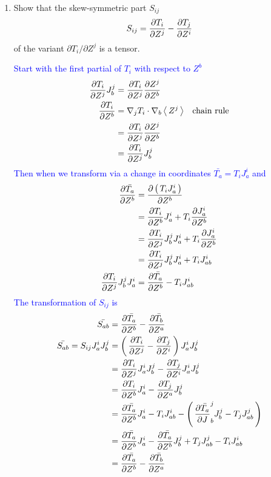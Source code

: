 \documentclass[12pt,a4paper]{report}
\newcommand{\RED}[1]{\textcolor{red}{#1}}
\newcommand{\BLUE}[1]{\textcolor{blue}{#1}}
\begin{document}
\begin{enumerate}[label=\textbf{\arabic*.}]
\BLUE{From 88 we have 
\begin{align*}
	\nabla' F &= \PART{F_i}{ Z^i} J^i_{i'}
\end{align*}differentiating this with respect to $Z^j$ gives us
\begin{align*}
	\PART{}{Z^j}\PAREN{\PART{F_i}{ Z^i} J^i_{i'}} &= \frac{\partial^2 F_i}{\partial Z^j\partial Z^i}J^i_{i'}+\PART{F_i}{ Z^i}\PAREN{\PART{}{Z^j} J^i_{i'} } \\
	&= \frac{\partial^2 F_i}{\partial Z^j\partial Z^i}J^i_{i'}+\PART{F_i}{ Z^i} J^i_{i'j}
\end{align*}Need to show that the second term is non-zero and therefore does not transform under a change of coordinates as a tensor.
}\RED{A more interesting question is: under what conditions is $J^i_{i'j}=0$?}

\newpage
\item Show that the skew-symmetric part $S_{ij}$
\begin{align*}
	S_{ij} = \frac{\partial T_i}{\partial Z^j}-\frac{\partial T_j}{\partial Z^i}
\end{align*}of the variant $\partial T_i/\partial Z^j$ is a tensor.

\BLUE{Start with the first partial of $T_i$ with respect to $Z^b$
\begin{align*}
	\frac{\partial T_i}{\partial Z^j}J^j_b &= \frac{\partial T_i}{\partial Z^j}\frac{\partial Z^j}{\partial Z^b}\\
	\frac{\partial T_i}{\partial Z^b} &= \nabla_j T_i\cdot \nabla_b\left \langle\, Z^j \,\right \rangle &\text{chain rule}\\
	&= \frac{\partial T_i}{\partial Z^j}\frac{\partial Z^j}{\partial Z^b} \\
	&= \frac{\partial T_i}{\partial Z^j}J^j_b
\end{align*}Then when we transform via a change in coordinates $\bar{T_a} = T_iJ^i_a$ and
\begin{align*}
	\frac{\partial \bar{T_a}}{\partial Z^b} &= \frac{\partial \left (\, T_iJ^i_a \,\right )}{\partial Z^b} \\
	&= \frac{\partial T_i}{\partial Z^b}J^i_a+T_i\frac{\partial J^i_a}{\partial Z^b} \\
	&= \frac{\partial T_i}{\partial Z^j}J^j_bJ^i_a+T_i\frac{\partial J^i_a}{\partial Z^b} \\
	&=\frac{\partial T_i}{\partial Z^j}J^j_bJ^i_a+T_iJ^i_{ab} \\
	\frac{\partial T_i}{\partial Z^j}J^j_bJ^i_a &= \frac{\partial \bar{T_a}}{\partial Z^b} - T_iJ^i_{ab}
\end{align*}The transformation of $S_{ij}$ is
\begin{align*}
	\bar{S_{ab}} &= \frac{\partial \bar{T_a}}{\partial Z^b}-\frac{\partial \bar{T_b}}{\partial Z^a} \\
	\bar{S_{ab}} = S_{ij}J^i_aJ^j_b &=  \left (\, \frac{\partial T_i}{\partial Z^j}-\frac{\partial T_j}{\partial Z^i} \,\right )J^i_aJ^j_b \\
	&= \frac{\partial T_i}{\partial Z^j}J^i_aJ^j_b-\frac{\partial T_j}{\partial Z^i}J^i_aJ^j_b \\
	&= \frac{\partial T_i}{\partial Z^b}J^i_a-\frac{\partial T_j}{\partial Z^a}J^j_b \\
	&=  \frac{\partial \bar{T_a}}{\partial Z^b}J^i_a - T_iJ^i_{ab} - \left (\,  \frac{\partial \bar{T_a}}{\partial J}^j_b{J^j_b} - T_jJ^j_{ab} \,\right ) \\
	&=  \frac{\partial \bar{T_a}}{\partial Z^b}J^i_a - \frac{\partial \bar{T_a}}{\partial Z^b}J^j_b + T_jJ^j_{ab} -  T_iJ^i_{ab} \\
	&= \frac{\partial \bar{T_a}}{\partial Z^b}-\frac{\partial \bar{T_b}}{\partial Z^a}
\end{align*}
}


\end{enumerate}
\end{document}
